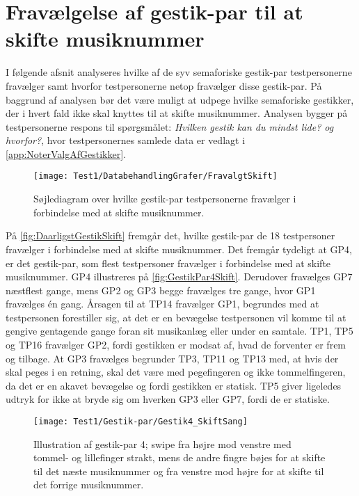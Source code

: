 \section{Fravælgelse af gestik-par til at skifte musiknummer}
\label{app:TestresultaterSkiftDaarlig}
%
I følgende afsnit analyseres hvilke af de syv semaforiske gestik-par testpersonerne fravælger samt hvorfor testpersonerne netop fravælger disse gestik-par. På baggrund af analysen bør det være muligt at udpege hvilke semaforiske gestikker, der i hvert fald ikke skal knyttes til at skifte musiknummer. Analysen bygger på testpersonerne respons til spørgsmålet: \textit{Hvilken gestik kan du mindst lide? og hvorfor?}, hvor testpersonernes samlede data er vedlagt i \autoref{app:NoterValgAfGestikker}.
%
\begin{figure}[H]
	\centering
	\texttt{[image: Test1/DatabehandlingGrafer/FravalgtSkift]}
	\caption{Søjlediagram over hvilke gestik-par testpersonerne fravælger i forbindelse med at skifte musiknummer.}
	\label{fig:DaarligstGestikSkift}
\end{figure}
\noindent
%
På \autoref{fig:DaarligstGestikSkift} fremgår det, hvilke gestik-par de 18 testpersoner fravælger i forbindelse med at skifte musiknummer. Det fremgår tydeligt at GP4, er det gestik-par, som flest testpersoner fravælger i forbindelse med at skifte musiknummer. GP4 illustreres på \autoref{fig:GestikPar4Skift}. Derudover fravælges GP7 næstflest gange, mens GP2 og GP3 begge fravælges tre gange, hvor GP1 fravælges én gang. Årsagen til at TP14 fravælger GP1, begrundes med at testpersonen forestiller sig, at det er en bevægelse testpersonen vil komme til at gengive gentagende gange foran sit musikanlæg eller under en samtale. TP1, TP5 og TP16 fravælger GP2, fordi gestikken er modsat af, hvad de forventer er frem og tilbage. At GP3 fravælges begrunder TP3, TP11 og TP13 med, at hvis der skal peges i en retning, skal det være med pegefingeren og ikke tommelfingeren, da det er en akavet bevægelse og fordi gestikken er statisk. TP5 giver ligeledes udtryk for ikke at bryde sig om hverken GP3 eller GP7, fordi de er statiske.
%
\begin{figure}[H]
	\centering
	\texttt{[image: Test1/Gestik-par/Gestik4\_SkiftSang]}
	\caption{Illustration af gestik-par 4; swipe fra højre mod venstre med tommel- og lillefinger strakt, mens de andre fingre bøjes for at skifte til det næste musiknummer og fra venstre mod højre for at skifte til det forrige musiknummer.}
	\label{fig:GestikPar4Skift}
\end{figure}
